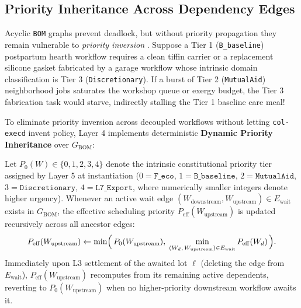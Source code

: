 \subsection{Priority Inheritance Across Dependency Edges}

Acyclic \texttt{BOM} graphs prevent deadlock, but without priority propagation they remain vulnerable to
\emph{priority inversion} \parencite{liu1973scheduling}. Suppose a Tier 1 (\texttt{B\_baseline})
postpartum hearth workflow requires a clean tiffin carrier or a replacement silicone gasket fabricated by
a garage workflow whose intrinsic domain classification is Tier 3 (\texttt{Discretionary}). If a burst of
Tier 2 (\texttt{MutualAid}) neighborhood jobs saturates the workshop queue or exergy budget, the Tier 3
fabrication task would starve, indirectly stalling the Tier 1 baseline care meal!

To eliminate priority inversion across decoupled workflows without letting \texttt{col-execd} invent
policy, Layer 4 implements deterministic \textbf{Dynamic Priority Inheritance} over $G_{\mathrm{BOM}}$:

\begin{invariant}
\label{inv:priority-inheritance}
Let $P_0(W) \in \{0, 1, 2, 3, 4\}$ denote the intrinsic constitutional priority tier assigned by Layer 5
at instantiation ($0 = \texttt{F\_eco}$, $1 = \texttt{B\_baseline}$, $2 = \texttt{MutualAid}$, $3 =
\texttt{Discretionary}$, $4 = \texttt{L7\_Export}$, where numerically smaller integers denote higher
urgency). Whenever an active wait edge $(W_{\mathrm{downstream}}, W_{\mathrm{upstream}}) \in
E_{\mathrm{wait}}$ exists in $G_{\mathrm{BOM}}$, the effective scheduling priority
$P_{\mathrm{eff}}(W_{\mathrm{upstream}})$ is updated recursively across all ancestor edges:
\begin{equation}
\label{eq:priority-inheritance}
P_{\mathrm{eff}}(W_{\mathrm{upstream}}) \leftarrow \min\Bigl(\, P_0(W_{\mathrm{upstream}}),\; \min_{(W_d,\, W_{\mathrm{upstream}}) \in E_{\mathrm{wait}}} P_{\mathrm{eff}}(W_d) \,\Bigr).
\end{equation}
Immediately upon L3 settlement of the awaited lot $\ell$ (deleting the edge from $E_{\mathrm{wait}}$),
$P_{\mathrm{eff}}(W_{\mathrm{upstream}})$ recomputes from its remaining active dependents, reverting to
$P_0(W_{\mathrm{upstream}})$ when no higher-priority downstream workflow awaits it.
\end{invariant}

